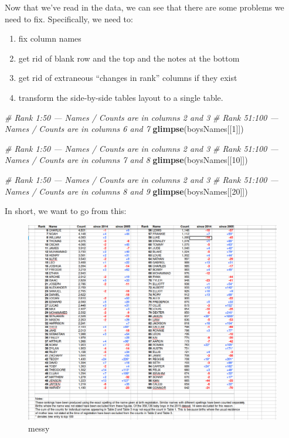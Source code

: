 \documentclass[]{book}
\newenvironment{Shaded}{\begin{snugshade}}{\end{snugshade}}
\newcommand{\CommentTok}[1]{\textcolor[rgb]{0.56,0.35,0.01}{\textit{#1}}}
\newcommand{\DecValTok}[1]{\textcolor[rgb]{0.00,0.00,0.81}{#1}}
\newcommand{\KeywordTok}[1]{\textcolor[rgb]{0.13,0.29,0.53}{\textbf{#1}}}
\newcommand{\NormalTok}[1]{#1}
\providecommand{\tightlist}{%
  \setlength{\itemsep}{0pt}\setlength{\parskip}{0pt}}
\begin{document}
Now that we've read in the data, we can see that there are some
problems we need to fix. Specifically, we need to:

\begin{enumerate}
\def\labelenumi{\arabic{enumi}.}
\tightlist
\item
  fix column names
\item
  get rid of blank row and the top and the notes at the bottom
\item
  get rid of extraneous ``changes in rank'' columns if they exist
\item
  transform the side-by-side tables layout to a single table.
\end{enumerate}

\begin{Shaded}
\begin{Highlighting}[]
\CommentTok{# Rank 1:50 --- Names / Counts are in columns 2 and 3 }
\CommentTok{# Rank 51:100 --- Names / Counts are in columns 6 and 7}
\KeywordTok{glimpse}\NormalTok{(boysNames[[}\DecValTok{1}\NormalTok{]]) }

\CommentTok{# Rank 1:50 --- Names / Counts are in columns 2 and 3 }
\CommentTok{# Rank 51:100 --- Names / Counts are in columns 7 and 8}
\KeywordTok{glimpse}\NormalTok{(boysNames[[}\DecValTok{10}\NormalTok{]]) }

\CommentTok{# Rank 1:50 --- Names / Counts are in columns 2 and 3 }
\CommentTok{# Rank 51:100 --- Names / Counts are in columns 8 and 9}
\KeywordTok{glimpse}\NormalTok{(boysNames[[}\DecValTok{20}\NormalTok{]]) }
\end{Highlighting}
\end{Shaded}

In short, we want to go from this:

\begin{figure}
\centering
\includegraphics{R/RDataWrangling/images/messy.png}
\caption{messy}
\end{figure}
\end{document}
